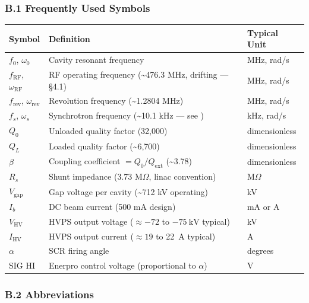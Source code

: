 \subsubsection{B.1 Frequently Used Symbols}\label{b1-frequently-used-symbols}

\begin{longtable}[]{@{}lll@{}}
\toprule\noalign{}
Symbol & Definition & Typical Unit \\
\midrule\noalign{}
\endhead
\bottomrule\noalign{}
\endlastfoot
$f_0$, $\omega_0$ & Cavity resonant frequency & MHz, rad/s \\
$f_\text{RF}$, $\omega_\text{RF}$ & RF operating frequency (\textasciitilde476.3 MHz, drifting --- §4.1) & MHz, rad/s \\
$f_\text{rev}$, $\omega_\text{rev}$ & Revolution frequency (\textasciitilde1.2804 MHz) & MHz, rad/s \\
$f_s$, $\omega_s$ & Synchrotron frequency (\textasciitilde10.1 kHz --- see \R{55}) & kHz, rad/s \\
$Q_0$ & Unloaded quality factor (32,000) & dimensionless \\
$Q_L$ & Loaded quality factor (\textasciitilde6,700) & dimensionless \\
$\beta$ & Coupling coefficient $= Q_0/Q_\text{ext}$ (\textasciitilde3.78) & dimensionless \\
$R_s$ & Shunt impedance (3.73 M$\Omega$, linac convention) & M$\Omega$ \\
$V_\text{gap}$ & Gap voltage per cavity (\textasciitilde712 kV operating) & kV \\
$I_b$ & DC beam current (500 mA design) & mA or A \\
$V_\text{HV}$ & HVPS output voltage ($\approx -72$ to $-\qty{75}{\kilo\volt}$ typical) & kV \\
$I_\text{HV}$ & HVPS output current ($\approx 19$ to \qty{22}{\ampere} typical) & A \\
$\alpha$ & SCR firing angle & degrees \\
SIG HI & Enerpro control voltage (proportional to $\alpha$) & V \\
\end{longtable}

\subsubsection{B.2 Abbreviations}\label{b2-abbreviations}

